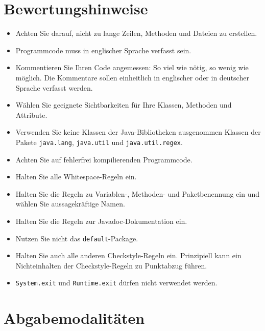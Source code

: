 \addtocounter{footnote}{1}\setcounter{required}{\value{footnote}}
\section*{Bewertungshinweise}
\begin{itemize}
	\item Achten Sie darauf, nicht zu lange Zeilen, Methoden und Dateien zu erstellen.\footnotemark[\value{required}]
	\item Programmcode muss in englischer Sprache verfasst sein.
	\item Kommentieren Sie Ihren Code angemessen: So viel wie nötig, so wenig wie möglich. Die Kommentare sollen einheitlich in englischer oder in deutscher Sprache verfasst werden.
	\item Wählen Sie geeignete Sichtbarkeiten für Ihre Klassen, Methoden und Attribute.
	\item Verwenden Sie keine Klassen der Java-Bibliotheken ausgenommen Klassen der Pakete \texttt{java.lang}, \texttt{java.util} und \texttt{java.util.regex}.\footnotemark[\value{required}]
	\item Achten Sie auf fehlerfrei kompilierenden Programmcode.\footnotemark[\value{required}]
	\item Halten Sie alle Whitespace-Regeln ein.\footnotemark[\value{required}]
	\item Halten Sie die Regeln zu Variablen-, Methoden- und Paketbenennung ein und wählen Sie aussagekräftige Namen.\footnotemark[\value{required}]
	\item Halten Sie die Regeln zur Javadoc-Dokumentation ein.\footnotemark[\value{required}]
	\item Nutzen Sie nicht das \texttt{default}-Package.\footnotemark[\value{required}]
	\item Halten Sie auch alle anderen Checkstyle-Regeln ein. Prinzipiell kann ein Nichteinhalten der Checkstyle-Regeln zu Punktabzug führen.
	\item \texttt{System.exit} und \texttt{Runtime.exit} dürfen nicht verwendet werden.\footnotemark[\value{required}]
\end{itemize}

\section*{Abgabemodalitäten}

